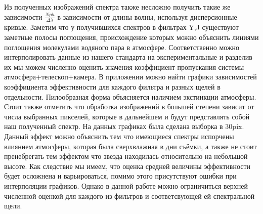 \documentclass[a4paper]{article}
\begin{document}
Из полученных изображений спектра также несложно получить такие же зависимости $\frac{Nph}{\Delta\lambda}$ в зависимости от длины волны, используя дисперсионные кривые. Заметим что у получившихся спектров в фильтрах Y,J существуют заметные полосы поглощения, происхождение которых можно объяснить линиями поглощения молекулами водяного пара в атмосфере\cite{vapour}. Соответственно можно интерполировать данные из нашего стандарта на экспериментальные и разделив их мы можем численно оценить значения коэффициент пропускания системы атмосфера+телескоп+камера. В приложении можно найти графики зависимостей коэффициента эффективности для каждого фильтра и разных щелей в отдельности. Пилообразная форма объясняется наличием экстинкции атмосферы. Стоит также отметить что обработка изображений в большей степени зависит от числа выбранных пикселей, которые в дальнейшем и будут представлять собой наш полученный спектр. На данных графиках была сделана выборка в 30pix. Данный эффект можно объяснить тем что имеющиеся спектры испорчены влиянием атмосферы, которая была сверхвлажная в дни съёмки, а также не стоит пренебрегать тем эффектом что звезда находилась относительно на небольшой высоте. Как следствие мы имеем, что оценка средней величины эффективности будет осложнена и варьироваться, помимо этого присутствуют ошибки при интерполяции графиков. Однако в данной работе можно ограничиться верхней численной оценкой для каждого из фильтров и соответсвующей ей спектральной щели.

\begin{figure}[h]
\end{figure}
\begin{figure}[h]
\end{figure}
\newpage
\end{document}
